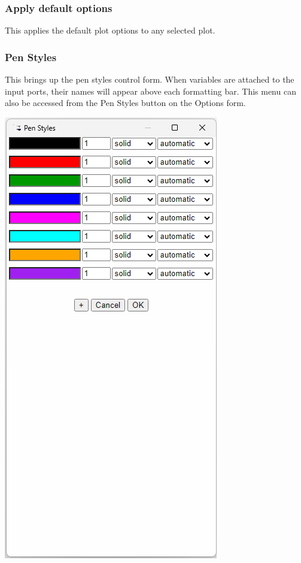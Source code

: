 \subsubsection{Apply default options}

This applies the default plot options to any selected plot.

\subsubsection{Pen Styles }

This brings up the pen styles control form. When variables are attached
to the input ports, their names will appear above each formatting
bar. This menu can also be accessed from the Pen Styles button on
the Options form.

\includegraphics{images/PlotPenStyles}

